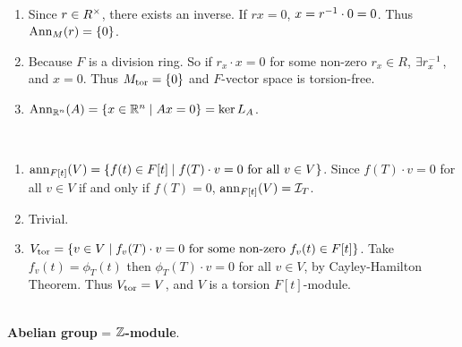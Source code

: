 \\
\begin{enumerate}
	\item Since $r\in R^\times$, there exists an inverse. If $rx = 0$, $x = r^{-1} \cdot 0 = 0$. Thus $\operatorname{Ann}_M(r) = \{0\}$.
	\item Because $F$ is a division ring. So if $r_x\cdot x = 0$ for some non-zero $r_x\in R$, $\exists r_x^{-1}$, and $x = 0$. Thus $M_{\text{tor}} = \{0\}$ and $F$-vector space is torsion-free.
	\item $\operatorname{Ann}_{\mathbb{R}^n}(A) = \{x \in \mathbb{R}^n \mid Ax = 0\} = \ker L_A$.
\end{enumerate}~
\\
\begin{enumerate}
	\item $\operatorname{ann}_{F[t]}(V) = \{f(t)\in F[t]\mid f(T)\cdot v = 0 \text{ for all } v \in V\}$. Since $f(T)\cdot v = 0$ for all $v\in V$ if and only if $f(T) = 0$, $\operatorname{ann}_{F[t]}(V) = \mathcal{I}_T$.
	\item Trivial.
	\item $V_{\text{tor}} = \{v\in V\mid f_v(T)\cdot v = 0 \text{ for some non-zero } f_v(t)\in F[t]\}$. Take $f_v(t) = \phi_T(t)$ then $\phi_T(T)\cdot v = 0$ for all $v\in V$, by Cayley-Hamilton Theorem. Thus $V_{\text{tor}} = V$, and $V$ is a torsion $F[t]$-module.
\end{enumerate}~
\\
 \textbf{Abelian group} = \textbf{$\mathbb{Z}$-module}.\\
\\
